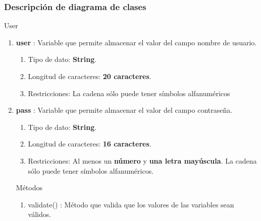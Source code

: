 \documentclass[12pt, a4paper, titlepage]{report}
\begin{document}
			    \subsubsection{Descripción de diagrama de clases}
			    \large User
			    \begin{enumerate}
    		        \item \textbf{user} : Variable que permite almacenar el valor del campo nombre de usuario.
    		        \begin{enumerate}
    		            \item Tipo de dato: \textbf{String}. \item Longitud de caracteres: \textbf{20 caracteres}.
    		            \item Restricciones: La cadena sólo puede tener símbolos alfanuméricos 
    		        \end{enumerate}
    		        \item \textbf{pass} : Variable que permite almacenar el valor del campo contraseña.
    		        \begin{enumerate}
    		            \item Tipo de dato: \textbf{String}. \item Longitud de caracteres: \textbf{16 caracteres}.
    		            \item Restricciones: Al menos un \textbf{número} y \textbf{una letra mayúscula}. La cadena sólo puede tener símbolos alfanuméricos.
    		        \end{enumerate}
    		        
    		        Métodos
    		        
    		        \begin{enumerate}
    		            \item validate() : Método que valida que los valores de las variables sean válidos.
    		        \end{enumerate}
			    \end{enumerate}
			        
\end{document}
